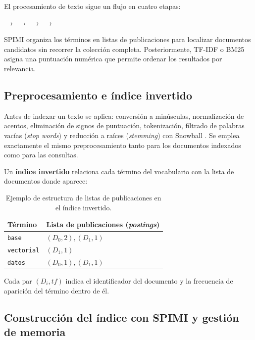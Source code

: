 \documentclass[11pt,a4paper]{article}
\begin{document}
El procesamiento de texto sigue un flujo en cuatro etapas:
\begin{center}
 $\longrightarrow$  $\longrightarrow$ 
$\longrightarrow$  $\longrightarrow$ 
\end{center}

SPIMI organiza los términos en listas de publicaciones para localizar documentos candidatos sin recorrer la colección completa. Posteriormente, TF-IDF o BM25 asigna una puntuación numérica que permite ordenar los resultados por relevancia.

\subsection{Preprocesamiento e índice invertido}

Antes de indexar un texto se aplica: conversión a minúsculas, normalización de acentos, eliminación de signos de puntuación, tokenización, filtrado de palabras vacías (\emph{stop words}) y reducción a raíces (\emph{stemming}) con Snowball . Se emplea exactamente el mismo preprocesamiento tanto para los documentos indexados como para las consultas.

Un \textbf{índice invertido} relaciona cada término del vocabulario con la lista de documentos donde aparece:
\begin{table}[H]
  \centering
  \small
  \begin{tabular}{@{}ll@{}}
    \toprule
    \textbf{Término} & \textbf{Lista de publicaciones (\emph{postings})} \\
    \midrule
    \texttt{base} & $(D_0,2), (D_1,1)$ \\
    \texttt{vectorial} & $(D_1,1)$ \\
    \texttt{datos} & $(D_0,1), (D_1,1)$ \\
    \bottomrule
  \end{tabular}
  \caption{Ejemplo de estructura de listas de publicaciones en el índice invertido.}
\end{table}

Cada par $(D_i, tf)$ indica el identificador del documento y la frecuencia de aparición del término dentro de él.

\subsection{Construcción del índice con SPIMI y gestión de memoria}
\end{document}

